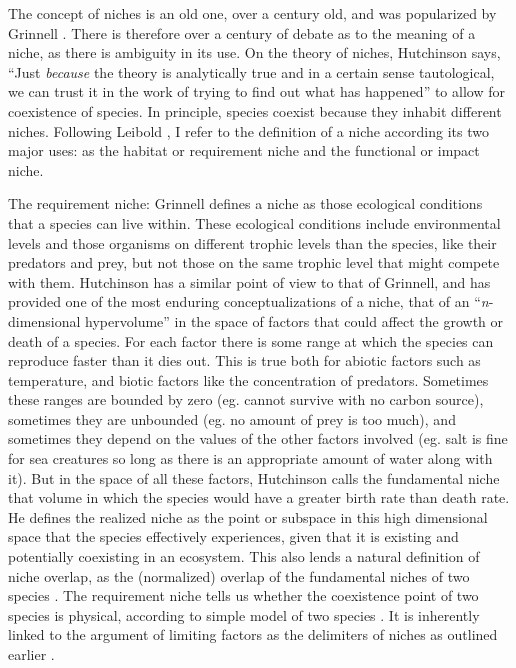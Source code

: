 The concept of niches is an old one, over a century old, and was popularized by Grinnell \cite{Grinnell1917}.
There is therefore over a century of debate as to the meaning of a niche, as there is ambiguity in its use.
On the theory of niches, Hutchinson \cite{Hutchinson1957} says, ``Just \emph{because} the theory is analytically true and in a certain sense tautological, we can trust it in the work of trying to find out what has happened'' to allow for coexistence of species.
In principle, species coexist because they inhabit different niches.
Following Leibold \cite{Leibold1995}, I refer to the definition of a niche according its two major uses: as the habitat or requirement niche and the functional or impact niche.

The requirement niche:
Grinnell \cite{Grinnell1917} defines a niche as those ecological conditions that a species can live within. 
These ecological conditions include environmental levels and those organisms on different trophic levels than the species, like their predators and prey, but not those on the same trophic level that might compete with them.
Hutchinson \cite{Hutchinson1957} has a similar point of view to that of Grinnell, and has provided one of the most enduring conceptualizations of a niche, that of an ``\emph{n}-dimensional hypervolume'' in the space of factors that could affect the growth or death of a species.
For each factor there is some range at which the species can reproduce faster than it dies out.
This is true both for abiotic factors such as temperature, and biotic factors like the concentration of predators.
Sometimes these ranges are bounded by zero (eg. cannot survive with no carbon source), sometimes they are unbounded (eg. no amount of prey is too much), and sometimes they depend on the values of the other factors involved (eg. salt is fine for sea creatures so long as there is an appropriate amount of water along with it). 
But in the space of all these factors, Hutchinson calls the fundamental niche that volume in which the species would have a greater birth rate than death rate. 
He defines the realized niche as the point or subspace in this high dimensional space that the species effectively experiences, given that it is existing and potentially coexisting in an ecosystem. 
This also lends a natural definition of niche overlap, as the (normalized) overlap of the fundamental niches of two species \cite{MacArthur1967}. 
The requirement niche tells us whether the coexistence point of two species is physical, according to simple model of two species \cite{Holt1994}. 
It is inherently linked to the argument of limiting factors as the delimiters of niches as outlined earlier \cite{Armstrong1976,McGehee1977a,Armstrong1980}. %

